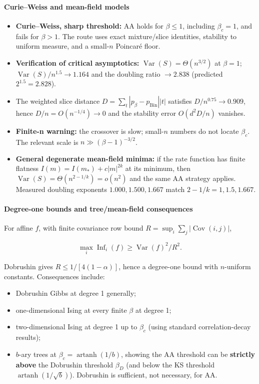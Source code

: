 \paragraph{Curie--Weiss and mean-field models}\label{curieweiss-and-mean-field-models}

\begin{itemize}
\tightlist
\item
  \textbf{Curie--Weiss, sharp threshold:} AA holds for \(\beta\le1\), including \(\beta_c=1\), and fails for \(\beta>1\). The route uses exact mixture/slice identities, stability to uniform measure, and a small-\(n\) Poincaré floor.
\item
  \textbf{Verification of critical asymptotics:}
  \(\operatorname{Var}(S)=\Theta(n^{3/2})\) at \(\beta=1\);
  \(\operatorname{Var}(S)/n^{1.5}\to1.164\) and the doubling ratio \(\to2.838\) (predicted \(2^{1.5}=2.828\)).
\item
  The weighted slice distance \(D=\sum_t|p_\beta-p_{\mathrm{Bin}}||t|\) satisfies
  \(D/n^{0.75}\to0.909\), hence \(D/n=O(n^{-1/4})\to0\) and the stability error \(O(d^2D/n)\) vanishes.
\item
  \textbf{Finite-n warning:} the crossover is slow; small-\(n\) numbers do not locate \(\beta_c\). The relevant scale is \(n\gg(\beta-1)^{-3/2}\).
\item
  \textbf{General degenerate mean-field minima:} if the rate function has finite flatness \(I(m)=I(m_*)+c|m|^{2k}\) at its minimum, then \(\operatorname{Var}(S)=\Theta(n^{2-1/k})=o(n^2)\) and the same AA strategy applies. Measured doubling exponents \(1.000,1.500,1.667\) match \(2-1/k=1,1.5,1.667\).
\end{itemize}

\paragraph{Degree-one bounds and tree/mean-field consequences}\label{degree-one-bounds-and-treemean-field-consequences}

For affine \(f\), with finite covariance row bound \(R=\sup_i\sum_j|\operatorname{Cov}(i,j)|\),

\[\max_i\operatorname{Inf}_i(f)\ge \operatorname{Var}(f)^2/R^2.\]

Dobrushin gives \(R\le1/[4(1-\alpha)]\), hence a degree-one bound with \(n\)-uniform constants. Consequences include:

\begin{itemize}
\tightlist
\item
  Dobrushin Gibbs at degree 1 generally;
\item
  one-dimensional Ising at every finite \(\beta\) at degree 1;
\item
  two-dimensional Ising at degree 1 up to \(\beta_c\) (using standard correlation-decay results);
\item
  \(b\)-ary trees at \(\beta_c=\operatorname{artanh}(1/b)\), showing the AA threshold can be \textbf{strictly above} the Dobrushin threshold \(\beta_D\) (and below the KS threshold \(\operatorname{artanh}(1/\sqrt b)\)). Dobrushin is sufficient, not necessary, for AA.
\end{itemize}

